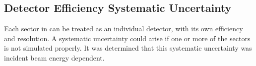 \subsection{Detector Efficiency Systematic Uncertainty}
 	Each sector in  can be treated as an individual detector, with its own efficiency and resolution. A systematic uncertainty could arise if one or more of the sectors is not simulated properly. It was determined that this systematic uncertainty was incident beam energy dependent.
 			

 					